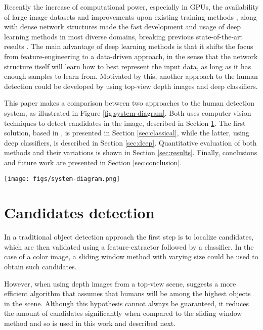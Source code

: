   Recently the increase of computational power, especially in GPUs, the availability of large image datasets and improvements upon existing training methods \cite{nair2010relu}, along with dense network structures \cite{NIPS2013_5207} made the fast development and usage of deep learning methods in most diverse domains, breaking previous state-of-the-art results \cite{hintonCONVNET}. The main advantage of deep learning methods is that it shifts the focus from feature-engineering to a data-driven approach, in the sense that the network structure itself will learn how to best represent the input data, as long as it has enough samples to learn from. Motivated by this, another approach to the human detection could be developed by using top-view depth images and deep classifiers.

  This paper makes a comparison between two approaches to the human detection system, as illustrated in Figure \ref{fig:system-diagram}. Both uses computer vision techniques to detect candidates in the image, described in Section \ref{sec:candidates}. The first solution, based in \cite{rauter}, is presented in Section \ref{sec:classical}, while the latter, using deep classifiers, is described in Section \ref{sec:deep}. Quantitative evaluation of both methods and their variations is shown in Section \ref{sec:results}. Finally, conclusions and future work are presented in Section \ref{sec:conclusion}.

  \begin{figure*}[!t]
  \centering
  \texttt{[image: figs/system-diagram.png]}
  \caption{Human detection system diagram.}
  \label{fig:system-diagram}
  \end{figure*}

\section{Candidates detection}
\label{sec:candidates}

    In a traditional object detection approach \cite{traditional-objdetect} the first step is to localize candidates, which are then validated using a feature-extractor followed by a classifier. In the case of a color image, a sliding window method with varying size could be used to obtain such candidates.

    However, when using depth images from a top-view scene, \cite{rauter} suggests a more efficient algorithm that assumes that humans will be among the highest objects in the scene. Although this hypothesis cannot always be guaranteed, it reduces the amount of candidates significantly when compared to the sliding window method and so is used in this work and described next.

